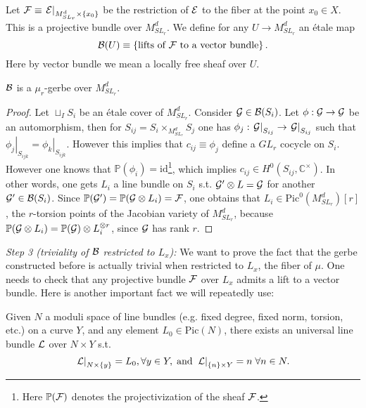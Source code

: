 Let $\mathcal{F} \equiv \left.\mathcal{E}\right|_{M^d_{SL_r}\times \{x_0\}}$ be the
restriction of $\mathcal{E}$ to the fiber at the point $x_0 \in X$. This is a
projective bundle over $M^d_{SL_r}$. We define for any $U \rightarrow
M^{d}_{SL_r}$ an \'etale map
\[\mathcal{B}(U) \equiv \left\{\mbox{lifts of }\mathcal{F}\mbox{ to a vector
    bundle}\right\}.\]
Here by vector bundle we mean a locally free sheaf over $U$.

\begin{lem}
$\mathcal{B}$ is a $\mu_r$-gerbe over $M^d_{SL_r}$.
\end{lem}

\begin{proof}
Let $\sqcup_IS_i$ be an \'etale cover of $M^d_{SL_r}$. Consider $\mathcal{G}
\in \mathcal{B}(S_i)$. Let $\phi: \mathcal{G} \rightarrow \mathcal{G}$ be an automorphism, then for
$S_{ij}=S_i\times_{M^d_{SL_r}}S_j$ one has $\phi_j:
\left.\mathcal{G}\right|_{S_{ij}}\rightarrow \left.\mathcal{G}\right|_{S_{ij}}$ such that
$\left.\phi_j\right|_{S_{ijk}} =
\left.\phi_k\right|_{S_{ijk}}$. However this implies that $c_{ij}
\equiv \phi_j$ define a $GL_r$ cocycle on $S_i$. However one knows
that $\mathbb{P}(\phi_i) = \mbox{id}$\footnote{Here $\mathbb{P}(\mathcal{F})$ denotes the
  projectivization of the sheaf $\mathcal{F}$.}, which implies $c_{ij} \in
H^0(S_{ij},\mathbb{C}^{\times})$. In other words, one gets $L_i$ a line
bundle on $S_i$ s.t. $\mathcal{G}'\otimes L = \mathcal{G}$ for another $\mathcal{G}' \in
\mathcal{B}(S_i)$. Since $\mathbb{P}(\mathcal{G}')=\mathbb{P}(\mathcal{G}\otimes L_i) = \mathcal{F}$, one obtains
that $L_i \in \mbox{Pic}^0(M^d_{SL_r})[r]$, the $r$-torsion points of the
Jacobian variety of $M^d_{SL_r}$, because $\mathbb{P}(\mathcal{G}\otimes L_i) =
\mathbb{P}(\mathcal{G})\otimes L^{\otimes r}_i$, since $\mathcal{G}$ has rank $r$.
\end{proof}

\textit{Step 3 (triviality of $\mathcal{B}$ restricted to $L_x$):}
We want to prove the fact that the gerbe constructed before is actually
trivial when restricted to $L_x$, the fiber of $\mu$. One needs to
check that any projective bundle $\mathcal{F}$ over $L_x$ admits a lift to a
vector bundle.  Here is another important fact we will repeatedly use:
\begin{prop}
Given $N$ a moduli space of line bundles (e.g. fixed degree, fixed
norm, torsion, etc.) on a curve $Y$, and any element $L_0 \in
\mbox{Pic}(N)$, there exists an universal line bundle $\mathcal{L}$ over $N\times Y$
s.t.
\[\left.\mathcal{L}\right|_{N\times \{y\}} = L_0, \forall y \in Y, \; \mbox{and} \;
\left.\mathcal{L}\right|_{\{n\}\times Y} = n \; \forall n \in N.\]
\end{prop}

